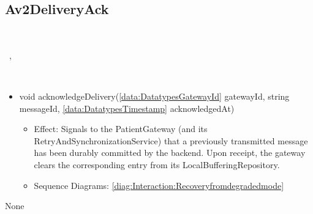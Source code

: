   \subsection{Av2DeliveryAck}\label{int:InterfacesAv2DeliveryAck}
    \begin{description}
      \item[Provided by:] \iconcomponent{}~
      \item[Required by:] \iconcomponent{}~, \iconcomponent{}~ 
      \item[Operations:] ~
    \begin{itemize}[noitemsep,nolistsep,leftmargin=-.25cm]
      \item \textsf{void acknowledgeDelivery(\ref{data:DatatypesGatewayId} gatewayId, string messageId, \ref{data:DatatypesTimestamp} acknowledgedAt)}
        \begin{itemize}[noitemsep,nolistsep]
           \item Effect: Signals to the PatientGateway (and its RetryAndSynchronizationService) that a previously transmitted message has been durably committed by the backend. Upon receipt, the gateway clears the corresponding entry from its LocalBufferingRepository. 
           \item Sequence Diagrams: \cref{diag:Interaction:Recoveryfromdegradedmode}
        \end{itemize}
    \end{itemize}
      \item[Diagrams:] None
    \end{description}

